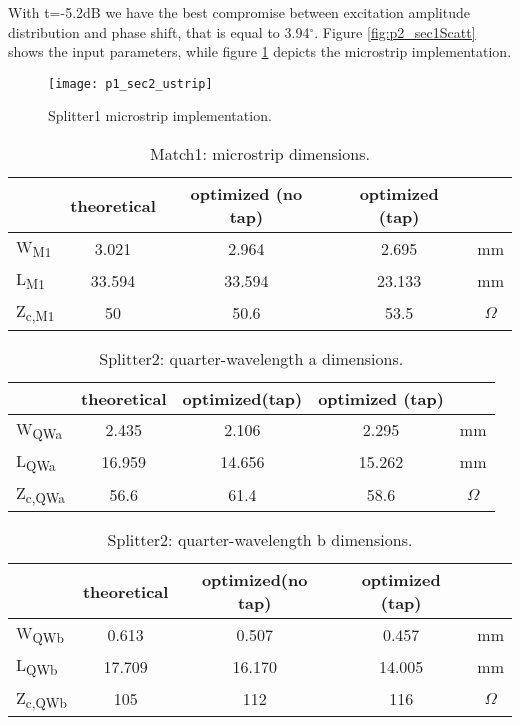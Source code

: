 With t=-5.2dB we have the best compromise between excitation amplitude distribution and phase shift, that is equal to 3.94$^\circ$.
Figure \ref{fig:p2_sec1Scatt} shows the input parameters, while figure \ref{fig:p1_sec2_ustrip} depicts the microstrip implementation.
\begin{figure}[t] 
	\centering
	\texttt{[image: p1\_sec2\_ustrip]}
	\caption{Splitter1 microstrip implementation. }
	\label{fig:p1_sec2_ustrip}
\end{figure}
\begin{table} [H]
	\label{tab:21_sec2DimM1}
	\caption{Match1: microstrip dimensions.}
	\centering	
	\begin{tabular}{lcccc} 
		\toprule
		& theoretical & optimized (no tap)& optimized (tap)&\\
		\midrule 
		W\textsubscript{M1} 	&	3.021		&	2.964	&2.695& mm 		\\
		L\textsubscript{M1}		&	33.594		& 	33.594	&23.133& mm		\\ 
		Z\textsubscript{c,M1}	&	50			& 	50.6	&53.5& $\Omega$		\\
		\bottomrule
	\end{tabular}	
\end{table}
\begin{table} [H]
	\label{tab:p2_sec2DimQWa}
	\caption{Splitter2: quarter-wavelength a dimensions.}
	\centering	
	\begin{tabular}{lcccc} 
		\toprule
		& theoretical & optimized(tap) &optimized (tap)&\\
		\midrule 
		W\textsubscript{QWa} 	&	2.435		&	2.106	&2.295& mm		\\
		L\textsubscript{QWa}	&	16.959		& 	14.656	&15.262& mm		\\ 
		Z\textsubscript{c,QWa}	&	56.6		& 	61.4	&58.6& $\Omega$		\\
		\bottomrule
	\end{tabular}	
\end{table}
\begin{table} [H]
	\label{tab:p2sec2DimQWb}
	\caption{Splitter2: quarter-wavelength b dimensions.}
	\centering	
	\begin{tabular}{lcccc} 
		\toprule
		& theoretical & optimized(no tap) &optimized (tap)&\\
		\midrule 
		W\textsubscript{QWb} 	&	0.613		&	0.507	&0.457& mm		\\
		L\textsubscript{QWb}	&	17.709		& 	16.170	&14.005& mm		\\ 
		Z\textsubscript{c,QWb}	&	105			& 	112		&116& $\Omega$		\\
		\bottomrule
	\end{tabular}	
\end{table}
\newpage

